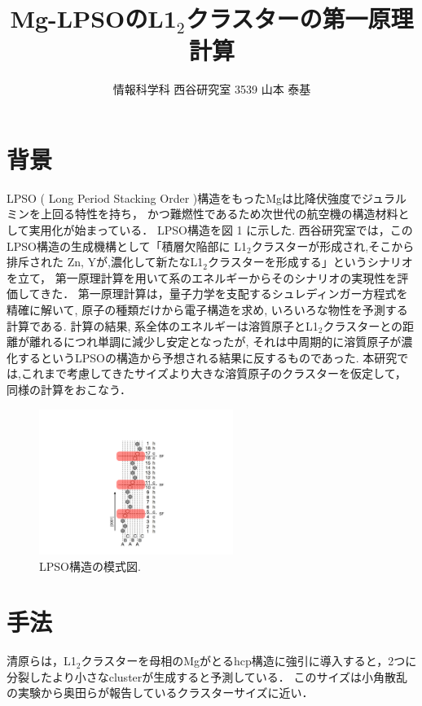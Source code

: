 \documentclass[a4j,twocolumn]{jsarticle}
\begin{document}
\title{Mg-LPSOのL1$_2$クラスターの第一原理計算}
\author{情報科学科 西谷研究室 3539 山本 泰基}
\date{}
\maketitle
\section{背景}
LPSO ( Long Period Stacking Order )構造をもったMgは比降伏強度でジュラルミンを上回る特性を持ち，
かつ難燃性であるため次世代の航空機の構造材料として実用化が始まっている．
LPSO構造を図 1 に示した\cite{kiyohara}. 
西谷研究室では，このLPSO構造の生成機構として「積層欠陥部に L1$_2$クラスターが形成され,そこから排斥された Zn, Yが,濃化して新たなL1$_2$クラスターを形成する」というシナリオを立て\cite{sakamoto}，
第一原理計算を用いて系のエネルギーからそのシナリオの実現性を評価してきた． 
第一原理計算は，量子力学を支配するシュレディンガー方程式を精確に解いて, 原子の種類だけから電子構造を求め, いろいろな物性を予測する計算である. 
計算の結果, 系全体のエネルギーは溶質原子とL1$_2$クラスターとの距離が離れるにつれ単調に減少し安定となったが, それは中周期的に溶質原子が濃化するというLPSOの構造から予想される結果に反するものであった. 
本研究では,これまで考慮してきたサイズより大きな溶質原子のクラスターを仮定して，同様の計算をおこなう．

\begin{figure}[htbp]
\begin{center}
\includegraphics[width=63mm]{lpso.png}
\caption{LPSO構造の模式図.}
\label{default}
\end{center}
\end{figure}

\section{手法}
清原らは，L1$_2$クラスターを母相のMgがとるhcp構造に強引に導入すると，2つに分裂したより小さなclusterが生成すると予測している\cite{kiyohara}．
このサイズは小角散乱の実験から奥田らが報告しているクラスターサイズに近い\cite{okuda}．
\end{document}
